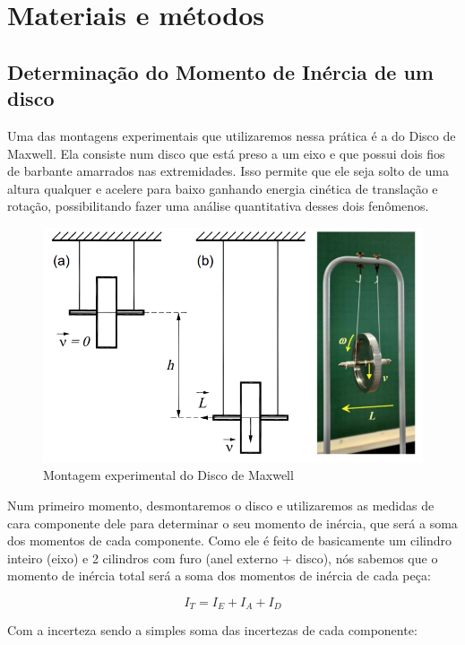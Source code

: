\newpage
\section{Materiais e métodos}


\subsection{Determinação do Momento de Inércia de um disco}

Uma das montagens experimentais que utilizaremos nessa prática é a do Disco de Maxwell. Ela consiste num disco que está preso a um eixo e que possui dois fios de barbante amarrados nas extremidades. Isso permite que ele seja solto de uma altura qualquer e acelere para baixo ganhando energia cinética de translação e rotação, possibilitando fazer uma análise quantitativa desses dois fenômenos. 

\begin{figure}[H]
  \centering
  \includegraphics[scale=0.5]{images/setup-maxwell.png}
  \caption{Montagem experimental do Disco de Maxwell}
\end{figure}

Num primeiro momento, desmontaremos o disco e utilizaremos as medidas de cara componente dele para determinar o seu momento de inércia, que será a soma dos momentos de cada componente. Como ele é feito de basicamente um cilindro inteiro (eixo) e 2 cilindros com furo (anel externo + disco), nós sabemos que o momento de inércia total será a soma dos momentos de inércia de cada peça:

\[I_T = I_E + I_A + I_D\]

Com a incerteza sendo a simples soma das incertezas de cada componente:

